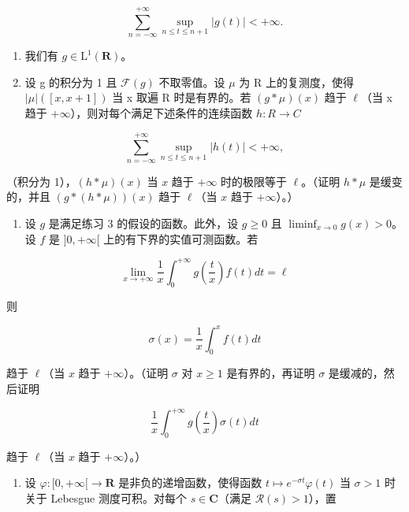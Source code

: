 \[
\sum_ {n = - \infty} ^ {+ \infty} \sup _ {n \leqslant t \leqslant n + 1} | g (t) | <   + \infty .
\]

\begin{enumerate}
\def\labelenumi{\alph{enumi})}
\item
  我们有 \(g \in \mathrm{L}^{1}(\mathbf{R})\)。
\item
  设 g 的积分为 1 且 \(\mathcal{F}(g)\) 不取零值。设 \(\mu\) 为 R 上的复测度，使得 \(|\mu|([x,x+1])\) 当 x 取遍 R 时是有界的。若 \((g*\mu)(x)\) 趋于 \(\ell\)（当 x 趋于 \(+\infty\)），则对每个满足下述条件的连续函数 \(h:R\to C\)
\end{enumerate}

\[
\sum_ {n = - \infty} ^ {+ \infty} \sup _ {n \leqslant t \leqslant n + 1} | h (t) | <   + \infty ,
\]

（积分为 1），\((h * \mu)(x)\) 当 \(x\) 趋于 \(+\infty\) 时的极限等于 \(\ell\)。（证明 \(h * \mu\) 是缓变的，并且 \((g * (h * \mu))(x)\) 趋于 \(\ell\)（当 \(x\) 趋于 \(+\infty\)）。）

\begin{enumerate}
\def\labelenumi{\arabic{enumi})}
\setcounter{enumi}{7}
\tightlist
\item
  设 \(g\) 是满足练习 3 的假设的函数。此外，设 \(g \geqslant 0\) 且 \(\liminf_{x \to 0} g(x) > 0\)。设 \(f\) 是 \(]0, +\infty[\) 上的有下界的实值可测函数。若
\end{enumerate}

\[
\lim _ {x \to + \infty} \frac {1}{x} \int_ {0} ^ {+ \infty} g \left(\frac {t}{x}\right) f (t) d t = \ell
\]

则

\[
\sigma (x) = \frac {1}{x} \int_ {0} ^ {x} f (t) d t
\]

趋于 \(\ell\)（当 \(x\) 趋于 \(+\infty\)）。（证明 \(\sigma\) 对 \(x \geqslant 1\) 是有界的，再证明 \(\sigma\) 是缓减的，然后证明

\[
\frac {1}{x} \int_ {0} ^ {+ \infty} g \left(\frac {t}{x}\right) \sigma (t) d t
\]

趋于 \(\ell\)（当 \(x\) 趋于 \(+\infty\)）。）

\begin{enumerate}
\def\labelenumi{\arabic{enumi})}
\setcounter{enumi}{8}
\tightlist
\item
  设 \(\varphi\colon[0,+\infty[\to\mathbf{R}\) 是非负的递增函数，使得函数 \(t\mapsto e^{-\sigma t}\varphi(t)\) 当 \(\sigma>1\) 时关于 Lebesgue 测度可积。对每个 \(s\in\mathbf{C}\)（满足 \(\mathcal{R}(s)>1\)），置
\end{enumerate}

